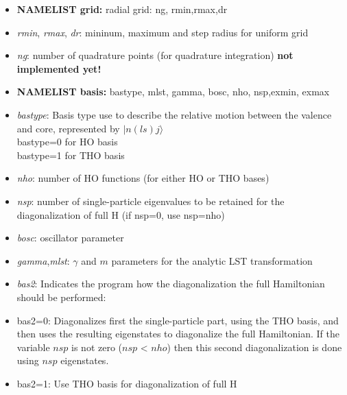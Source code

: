 \documentclass[preprint,12pt]{elsarticle}
\begin{document}
\begin{itemize}
\item \textbf{NAMELIST grid:} radial grid: ng, rmin,rmax,dr
\bi
\item {\em rmin}, {\em rmax}, {\em dr}: mininum, maximum and step radius for uniform grid
\item {\em ng}: number of quadrature points (for quadrature integration) {\bf not implemented yet!}
\ei



\item \textbf{NAMELIST basis:} bastype, mlst, gamma, bosc, nho, nsp,exmin, exmax 
\bi
\item {\it bastype}: Basis type use to describe the relative motion between the valence and core, represented by  $|n (ls)j\rangle$  \\
            bastype=0 for HO basis \\
            bastype=1 for THO basis

\item {\it nho}: number of HO functions (for either HO or THO bases)
\item  {\it nsp}: number of single-particle eigenvalues to be retained for the diagonalization of full H
                  (if nsp=0, use nsp=nho)
\item  {\it bosc}: oscillator parameter
\item {\it gamma},{\it mlst}: $\gamma$ and $m$ parameters for the analytic LST transformation
\item {\it bas2}: Indicates the program how the diagonalization the full Hamiltonian should be performed: 
\bi
\item              bas2=0: Diagonalizes first the single-particle part, using the THO basis, and then uses the resulting eigenstates to diagonalize the full Hamiltonian. If the variable $nsp$ is not zero ($nsp$ < $nho$) then this second diagonalization is done using $nsp$ eigenstates. 
\item              bas2=1: Use THO basis for diagonalization of full H
\ei
\ei



\end{itemize}
\end{document}
